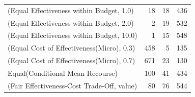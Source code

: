 \documentclass{article}
\begin{document}
\begin{table}[ht]
{\begin{tabular}{lrrr}
(Equal Effectiveness within Budget, 1.0)   &              18 &                                                   18 &                             436 \\
(Equal Effectiveness within Budget, 2.0)   &               2 &                                                   19 &                             532 \\
(Equal Effectiveness within Budget, 10.0)  &               1 &                                                   15 &                             548 \\
(Equal Cost of Effectiveness(Micro), 0.3)  &             458 &                                                    5 &                             135 \\
(Equal Cost of Effectiveness(Micro), 0.7)  &             671 &                                                    23 &                             130 \\
Equal(Conditional Mean Recourse)           &             100 &                                                  41 &                             434 \\
(Fair Effectiveness-Cost Trade-Off, value) &              80 &                                                  76 &                             544 \\

\bottomrule
\end{tabular}
}
\end{table}
\end{document}
